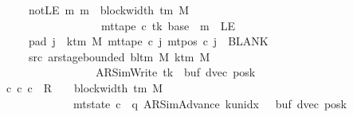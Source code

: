 \begin{isabellebody}
\ \ \ \ \ \ \ notLE{\isacharcolon}{\kern0pt}\ {\isachardoublequoteopen}{\isasymAnd}m{\isachardot}{\kern0pt}\ m\ {\isasymle}\ block{\isacharunderscore}{\kern0pt}width\ {\isacharparenleft}{\kern0pt}{\isasymGamma}{\isacharunderscore}{\kern0pt}tm\ M{\isacharparenright}{\kern0pt}\isanewline
\ \ \ \ \ \ \ \ \ \ \ \ \ \ \ \ \ \ \ {\isasymLongrightarrow}\ mt{\isacharunderscore}{\kern0pt}tape\ c{\isacharprime}{\kern0pt}\ tk\ {\isacharparenleft}{\kern0pt}base\ {\isacharplus}{\kern0pt}\ m{\isacharparenright}{\kern0pt}\ {\isasymnoteq}\ LE{}{\isachardoublequoteclose}\isanewline
\ \ \ \ \ \ \ pad{}{\isacharcolon}{\kern0pt}\ {\isachardoublequoteopen}{\isasymforall}j\ {\isasymge}\ k{\isacharunderscore}{\kern0pt}tm\ M{\isachardot}{\kern0pt}\ mt{\isacharunderscore}{\kern0pt}tape\ c{\isacharprime}{\kern0pt}\ j\ {\isacharparenleft}{\kern0pt}mt{\isacharunderscore}{\kern0pt}pos\ c{\isacharprime}{\kern0pt}\ j{\isacharparenright}{\kern0pt}\ {\isacharequal}{\kern0pt}\ BLANK{}{\isachardoublequoteclose}\isanewline
\ \ \ \ \ \ \ src{}{\isacharcolon}{\kern0pt}\ {\isachardoublequoteopen}ar{\isacharunderscore}{\kern0pt}stage{\isacharunderscore}{\kern0pt}bounded\ {\isacharparenleft}{\kern0pt}bl{\isacharunderscore}{\kern0pt}tm\ M{\isacharparenright}{\kern0pt}\ {\isacharparenleft}{\kern0pt}k{\isacharunderscore}{\kern0pt}tm\ M{\isacharparenright}{\kern0pt}\isanewline
\ \ \ \ \ \ \ \ \ \ \ \ \ \ \ \ \ \ \ {\isacharparenleft}{\kern0pt}AR{\isacharunderscore}{\kern0pt}SimWrite{\isacharcomma}{\kern0pt}\ tk{\isacharcomma}{\kern0pt}\ {}{\isacharcomma}{\kern0pt}\ buf{\isacharcomma}{\kern0pt}\ dvec{\isacharcomma}{\kern0pt}\ posk{\isacharparenright}{\kern0pt}{\isachardoublequoteclose}\isanewline
\ \ \ {\isachardoublequoteopen}{\isasymexists}c{\isacharprime}{\kern0pt}{\isacharprime}{\kern0pt}{\isachardot}{\kern0pt}\ {\isacharparenleft}{\kern0pt}c{\isacharprime}{\kern0pt}{\isacharcomma}{\kern0pt}\ c{\isacharprime}{\kern0pt}{\isacharprime}{\kern0pt}{\isacharparenright}{\kern0pt}\ {\isasymin}\ R{\isacharprime}{\kern0pt}\ {\isacharcircum}{\kern0pt}{\isacharcircum}{\kern0pt}\ {\isacharparenleft}{\kern0pt}{}\ {\isacharasterisk}{\kern0pt}\ block{\isacharunderscore}{\kern0pt}width\ {\isacharparenleft}{\kern0pt}{\isasymGamma}{\isacharunderscore}{\kern0pt}tm\ M{\isacharparenright}{\kern0pt}{\isacharparenright}{\kern0pt}\isanewline
\ \ \ \ \ \ \ \ \ \ \ \ \ \ {\isasymand}\ mt{\isacharunderscore}{\kern0pt}state\ c{\isacharprime}{\kern0pt}{\isacharprime}{\kern0pt}\ {\isacharequal}{\kern0pt}\ {\isacharparenleft}{\kern0pt}q{\isacharcomma}{\kern0pt}\ AR{\isacharunderscore}{\kern0pt}SimAdvance{\isacharcomma}{\kern0pt}\ k{\isacharunderscore}{\kern0pt}unidx\ {}{\isacharcomma}{\kern0pt}\ {}{\isacharcomma}{\kern0pt}\ buf{\isacharcomma}{\kern0pt}\ dvec{\isacharcomma}{\kern0pt}\ posk{\isacharparenright}{\kern0pt}\isanewline

\end{isabellebody}
